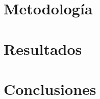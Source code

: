 \documentclass[11pt,usenames,dvipsnames,a4paper,twoside]{article}
\begin{document}

\newpage
\section{Metodología}


\newpage
\section{Resultados}


\newpage
\section{Conclusiones}
\end{document}
